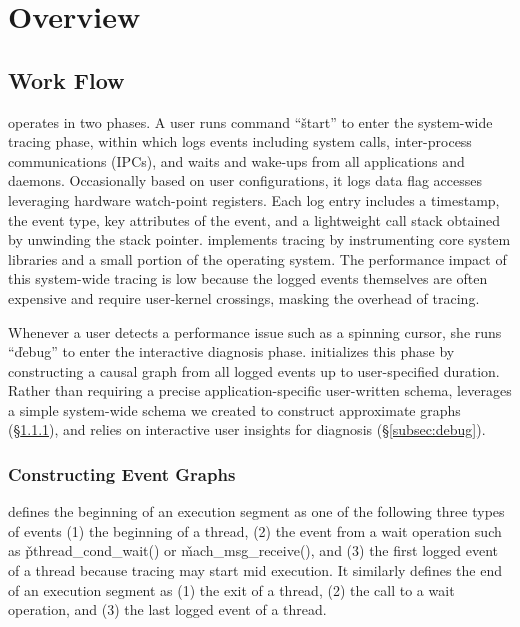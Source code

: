 \section{Overview}
\label{sec:overview}

\subsection{\xxx Work Flow}

\xxx operates in two phases.  A user runs command ``\v{\xxx start}'' to
enter the system-wide tracing phase, within which \xxx logs events
including system calls, inter-process communications (IPCs), and waits and
wake-ups from all applications and daemons.  Occasionally based on user
configurations, it logs data flag accesses leveraging hardware
watch-point registers.  Each log entry includes a timestamp, the event
type, key attributes of the event, and a lightweight call stack obtained
by unwinding the stack pointer.  \xxx implements tracing by instrumenting
core system libraries and a small portion of the operating system.  The
performance impact of this system-wide tracing is low because the logged
events themselves are often expensive and require user-kernel crossings,
masking the overhead of tracing.

Whenever a user detects a performance issue such as a spinning cursor, she
runs ``\v{\xxx debug}'' to enter the interactive diagnosis phase.  \xxx
initializes this phase by constructing a causal graph from all logged
events up to user-specified duration.  Rather than requiring a precise
application-specific user-written schema, \xxx leverages a simple
system-wide schema we created to construct approximate graphs
(\S\ref{subsec:graph}), and relies on interactive user insights for
diagnosis (\S\ref{subsec:debug}).

\subsubsection{Constructing Event Graphs} \label{subsec:graph}

\xxx defines the beginning of an execution segment as one of the following
three types of events (1) the beginning of a thread, (2) the event from a
wait operation such as \v{pthread\_cond\_wait()} or
\v{mach\_msg\_receive()}, and (3) the first logged event of a thread
because tracing may start mid execution.  It similarly defines the end of
an execution segment as (1) the exit of a thread, (2) the call to a wait
operation, and (3) the last logged event of a thread.

